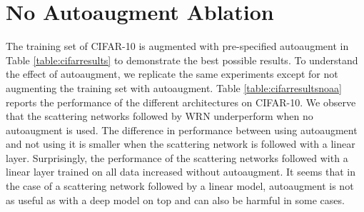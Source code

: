 \documentclass[10pt,twocolumn,letterpaper]{article}
\begin{document}
\section{No Autoaugment Ablation} 
\label{appendic:noautoaugment}
The training set of CIFAR-10 is augmented
with pre-specified autoaugment in Table \ref{table:cifarresults} to demonstrate the best possible results. To understand the effect of autoaugment, we replicate the same experiments except for not augmenting the training set with autoaugment. Table \ref{table:cifarresultsnoaa} reports the performance of the different architectures on CIFAR-10. We observe that the scattering networks followed by WRN underperform when no autoaugment is used. The difference in performance between using autoaugment and not using it is smaller when the scattering network is followed with a linear layer. 
Surprisingly, the performance of the scattering networks followed with a linear layer trained on all data increased without autoaugment. It seems that in the case of a scattering network followed by a linear model, autoaugment is not as useful as with a deep model on top and can also be harmful in some cases.  
\end{document}
